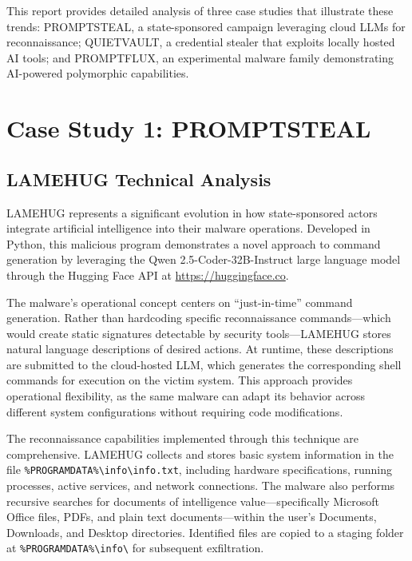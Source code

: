 \documentclass[12pt,a4paper]{article}
\begin{document}
This report provides detailed analysis of three case studies that illustrate these trends: PROMPTSTEAL, a state-sponsored campaign leveraging cloud LLMs for reconnaissance; QUIETVAULT, a credential stealer that exploits locally hosted AI tools; and PROMPTFLUX, an experimental malware family demonstrating AI-powered polymorphic capabilities.

\section{Case Study 1: PROMPTSTEAL}

\subsection{LAMEHUG Technical Analysis}

LAMEHUG represents a significant evolution in how state-sponsored actors integrate artificial intelligence into their malware operations. Developed in Python, this malicious program demonstrates a novel approach to command generation by leveraging the Qwen 2.5-Coder-32B-Instruct large language model through the Hugging Face API at \url{https://huggingface.co}.

The malware's operational concept centers on ``just-in-time'' command generation. Rather than hardcoding specific reconnaissance commands—which would create static signatures detectable by security tools—LAMEHUG stores natural language descriptions of desired actions. At runtime, these descriptions are submitted to the cloud-hosted LLM, which generates the corresponding shell commands for execution on the victim system. This approach provides operational flexibility, as the same malware can adapt its behavior across different system configurations without requiring code modifications.

The reconnaissance capabilities implemented through this technique are comprehensive. LAMEHUG collects and stores basic system information in the file \texttt{\%PROGRAMDATA\%\textbackslash info\textbackslash info.txt}, including hardware specifications, running processes, active services, and network connections. The malware also performs recursive searches for documents of intelligence value—specifically Microsoft Office files, PDFs, and plain text documents—within the user's Documents, Downloads, and Desktop directories. Identified files are copied to a staging folder at \texttt{\%PROGRAMDATA\%\textbackslash info\textbackslash} for subsequent exfiltration.
\end{document}
